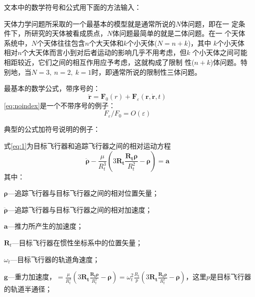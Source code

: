 \label{Tricks:Equations}

文本中的数学符号和公式用下面的方法输入：

天体力学问题所采取的一个最基本的模型就是通常所说的$N$体问题，即在一
定条件下，所研究的天体被看成质点，$N$体问题最简单的就是二体问题。在一
个天体系统中，$N$个天体往往包含$n$个大天体和$k$个小天体($N=n+k$)，其中
$k$个小天体相对$n$个大天体而言小到对后者运动的影响几乎不用考虑，但$k$
个小天体之间可能相距较近，它们之间的相互作用应予考虑，这就构成了限制
性($n+k$)体问题。特别地，当$N=3,~n=2,~k=1$时，即通常所说的限制性三体问题。


最基本的数学公式，带序号的：
\begin{equation}
\ddot{\mathbf{r}}=\mathbf{F}_{0}(r)+\mathbf{F}_{\varepsilon}(\mathbf{r},\dot{\mathbf{r}},t)
\end{equation}
\eqref{eq:noindex}是一个不带序号的例子：
\begin{displaymath}\label{eq:noindex}
F_{\varepsilon}/F_{0}=O (\varepsilon)
\end{displaymath}

\FloatBarrier %
典型的公式加符号说明的例子：

式\eqref{eq:1}为目标飞行器和追踪飞行器之间的相对运动方程
\begin{equation}\label{eq:1}
\ddot{\boldsymbol{\rho}}-\frac{\mu}{R_{t}^{3}}\left( 3\mathbf{R_{t}}\frac{\mathbf{R_{t}\rho}}{R_{t}^{2}}-\boldsymbol{\rho}\right)=\mathbf{a}
\end{equation}
其中：

$\boldsymbol{\rho}$---追踪飞行器与目标飞行器之间的相对位置矢量；

$\ddot{\boldsymbol{\rho}}$---追踪飞行器与目标飞行器之间的相对加速度；

$\mathbf{a}$---推力所产生的加速度；

$\mathbf{R}_{t}$---目标飞行器在惯性坐标系中的位置矢量；

$\omega_{t}$---目标飞行器的轨道角速度；

$\mathbf{g}$---重力加速度，$=\frac{\mu}{R_{t}^{3}}\left(
3\mathbf{R_{t}}\frac{\mathbf{R_{t}\rho}}{R_{t}^{2}}-\boldsymbol{\rho}\right)=\omega_{t}^{2}\frac{R_{t}}{p}\left(
3\mathbf{R_{t}}\frac{\mathbf{R_{t}\rho}}{R_{t}^{2}}-\boldsymbol{\rho}\right)$，这里$p$是目标飞行器的轨道半通径；

